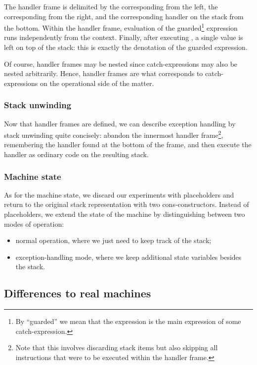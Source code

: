 The handler frame is delimited by the corresponding  from the left,
the corresponding  from the right, and the corresponding handler
on the stack from the bottom. Within the handler frame, evaluation of the
guarded\footnote{%
By ``guarded'' we mean that the expression is the main expression of
some catch-expression.
} expression runs independently from the context. Finally, after executing
, a single value is left on top of the stack: this is exactly
the denotation of the guarded expression.

Of course, handler frames may be nested since catch-expressions may also
be nested arbitrarily.
Hence, handler frames are what corresponds to catch-expressions on the operational
side of the matter.

\subsubsection{Stack unwinding}

Now that handler frames are defined, we can describe exception handling
by stack unwinding quite concisely: abandon the innermost handler frame\footnote{%
Note that this involves discarding stack items but also skipping all instructions
that were to be executed within the handler frame.},
remembering the handler found at the bottom of the frame, and then
execute the handler as ordinary code on the resulting stack.

\subsubsection{Machine state}

As for the machine state, we discard our experiments with placeholders and return
to the original stack representation with two cons-constructors.
Instead of placeholders, we extend the state of the machine by distinguishing between
two modes of operation:
\begin{itemize}
	\item normal operation, where we just need to keep track of the stack;
	\item exception-handling mode, where we keep additional state variables besides the stack.
\end{itemize}

\subsection{Differences to real machines}

